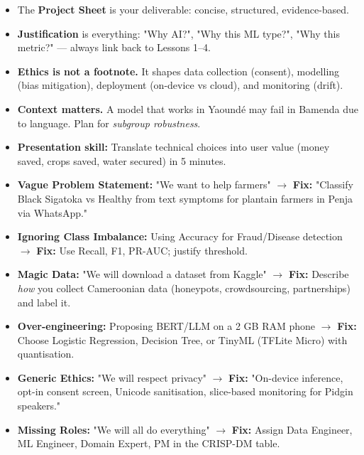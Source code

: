 \documentclass[11pt]{article}
\begin{document}
\begin{aretenir}
\begin{itemize}
\item The \textbf{Project Sheet} is your deliverable: concise, structured, evidence-based.
\item \textbf{Justification} is everything: "Why AI?", "Why this ML type?", "Why this metric?" — always link back to Lessons 1--4.
\item \textbf{Ethics is not a footnote.} It shapes data collection (consent), modelling (bias mitigation), deployment (on-device vs cloud), and monitoring (drift).
\item \textbf{Context matters.} A model that works in Yaoundé may fail in Bamenda due to language. Plan for \emph{subgroup robustness}.
\item \textbf{Presentation skill:} Translate technical choices into user value (money saved, crops saved, water secured) in 5 minutes.
\end{itemize}
\end{aretenir}

\begin{attention}
\begin{itemize}
\item \textbf{Vague Problem Statement:} "We want to help farmers" $\rightarrow$ \textbf{Fix:} "Classify Black Sigatoka vs Healthy from text symptoms for plantain farmers in Penja via WhatsApp."
\item \textbf{Ignoring Class Imbalance:} Using Accuracy for Fraud/Disease detection $\rightarrow$ \textbf{Fix:} Use Recall, F1, PR-AUC; justify threshold.
\item \textbf{Magic Data:} "We will download a dataset from Kaggle" $\rightarrow$ \textbf{Fix:} Describe \emph{how} you collect Cameroonian data (honeypots, crowdsourcing, partnerships) and label it.
\item \textbf{Over-engineering:} Proposing BERT/LLM on a 2 GB RAM phone $\rightarrow$ \textbf{Fix:} Choose Logistic Regression, Decision Tree, or TinyML (TFLite Micro) with quantisation.
\item \textbf{Generic Ethics:} "We will respect privacy" $\rightarrow$ \textbf{Fix:} "On-device inference, opt-in consent screen, Unicode sanitisation, slice-based monitoring for Pidgin speakers."
\item \textbf{Missing Roles:} "We will all do everything" $\rightarrow$ \textbf{Fix:} Assign Data Engineer, ML Engineer, Domain Expert, PM in the CRISP-DM table.
\end{itemize}
\end{attention}
\end{document}
